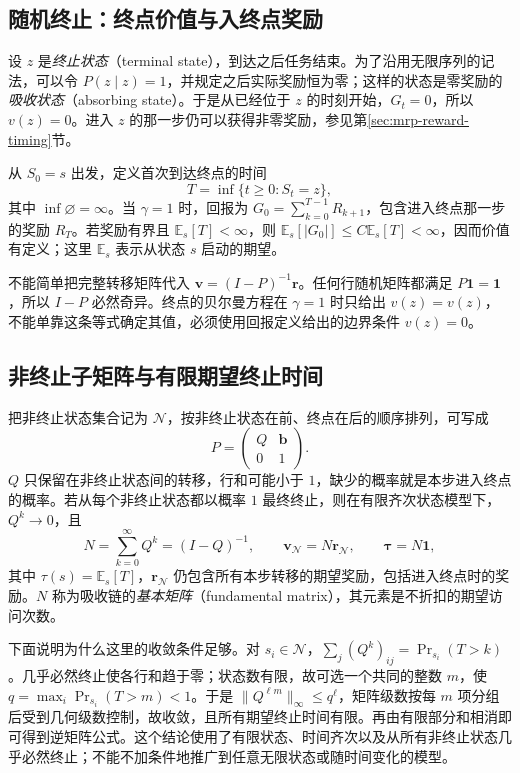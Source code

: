 \documentclass[UTF8,12pt,a4paper,fontset=fandol]{ctexart}
\begin{document}
\subsection{随机终止：终点价值与入终点奖励}

设 $z$ 是\emph{终止状态}（terminal state），到达之后任务结束。为了沿用无限序列的记法，可以令 $P(z\mid z)=1$，并规定之后实际奖励恒为零；这样的状态是零奖励的\emph{吸收状态}（absorbing state）。于是从已经位于 $z$ 的时刻开始，$G_t=0$，所以 $v(z)=0$。进入 $z$ 的那一步仍可以获得非零奖励，参见第\ref{sec:mrp-reward-timing}节。

从 $S_0=s$ 出发，定义首次到达终点的时间
\[
  T=\inf\{t\geq0:S_t=z\},
\]
其中 $\inf\varnothing=\infty$。当 $\gamma=1$ 时，回报为 $G_0=\sum_{k=0}^{T-1}R_{k+1}$，包含进入终点那一步的奖励 $R_T$。若奖励有界且 $\mathbb E_s[T]<\infty$，则 $\mathbb E_s[|G_0|]\leq C\mathbb E_s[T]<\infty$，因而价值有定义；这里 $\mathbb E_s$ 表示从状态 $s$ 启动的期望。

不能简单把完整转移矩阵代入 $\boldsymbol v=(I-P)^{-1}\boldsymbol r$。任何行随机矩阵都满足 $P\boldsymbol 1=\boldsymbol 1$，所以 $I-P$ 必然奇异。终点的贝尔曼方程在 $\gamma=1$ 时只给出 $v(z)=v(z)$，不能单靠这条等式确定其值，必须使用回报定义给出的边界条件 $v(z)=0$。

\subsection{非终止子矩阵与有限期望终止时间}

把非终止状态集合记为 $\mathcal N$，按非终止状态在前、终点在后的顺序排列，可写成
\[
  P=\begin{pmatrix}Q&\boldsymbol b\\0&1\end{pmatrix}.
\]
$Q$ 只保留在非终止状态间的转移，行和可能小于 $1$，缺少的概率就是本步进入终点的概率。若从每个非终止状态都以概率 $1$ 最终终止，则在有限齐次状态模型下，$Q^k\to0$，且
\begin{equation}
  N=\sum_{k=0}^{\infty}Q^k=(I-Q)^{-1},\qquad
  \boldsymbol v_{\mathcal N}=N\boldsymbol r_{\mathcal N},\qquad
  \boldsymbol\tau=N\boldsymbol 1,
  \label{eq:mrp-transient-system}
\end{equation}
其中 $\tau(s)=\mathbb E_s[T]$，$\boldsymbol r_{\mathcal N}$ 仍包含所有本步转移的期望奖励，包括进入终点时的奖励。$N$ 称为吸收链的\emph{基本矩阵}（fundamental matrix），其元素是不折扣的期望访问次数。

下面说明为什么这里的收敛条件足够。对 $s_i\in\mathcal N$，$\sum_j(Q^k)_{ij}=\Pr_{s_i}(T>k)$。几乎必然终止使各行和趋于零；状态数有限，故可选一个共同的整数 $m$，使 $q=\max_i\Pr_{s_i}(T>m)<1$。于是 $\|Q^{\ell m}\|_\infty\leq q^\ell$，矩阵级数按每 $m$ 项分组后受到几何级数控制，故收敛，且所有期望终止时间有限。再由有限部分和相消即可得到逆矩阵公式。这个结论使用了有限状态、时间齐次以及从所有非终止状态几乎必然终止；不能不加条件地推广到任意无限状态或随时间变化的模型。
\end{document}
